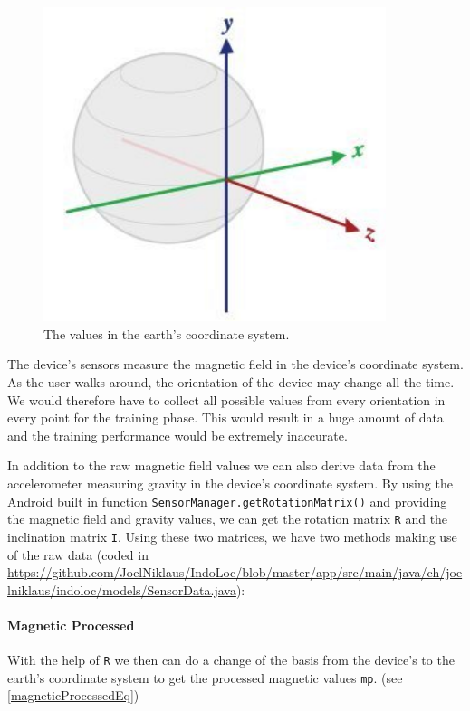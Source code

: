 \begin{figure}[H]
\centering
\includegraphics[width=100mm]{Figures/Earth.jpg}
\decoRule
\caption[Earth]{The values in the earth's coordinate system.}
\label{fig:Earth}
\end{figure}

The device's sensors measure the magnetic field in the device's coordinate system. As the user walks around, the orientation of the device may change all the time. We would therefore have to collect all possible values from every orientation in every point for the training phase. This would result in a huge amount of data and the training performance would be extremely inaccurate. 


In addition to the raw magnetic field values we can also derive data from the accelerometer measuring gravity in the device's coordinate system. By using the Android built in function \texttt{SensorManager.getRotationMatrix()} and providing the magnetic field and gravity values, we can get the rotation matrix \texttt{R} and the inclination matrix \texttt{I}.
Using these two matrices, we have two methods making use of the raw data (coded in \url{https://github.com/JoelNiklaus/IndoLoc/blob/master/app/src/main/java/ch/joelniklaus/indoloc/models/SensorData.java}):



\paragraph{Magnetic Processed}

With the help of \texttt{R} we then can do a change of the basis from the device's to the earth's coordinate system to get the processed magnetic values \texttt{mp}. (see \ref{magneticProcessedEq})

